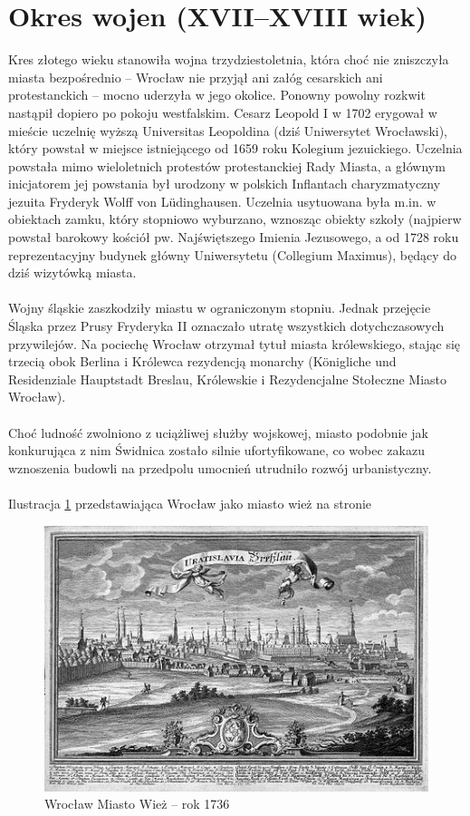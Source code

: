 \documentclass{article}
\begin{document}
\section{Okres wojen (XVII–XVIII wiek)}
Kres złotego wieku stanowiła wojna trzydziestoletnia, która choć nie zniszczyła miasta bezpośrednio – Wrocław nie przyjął ani załóg cesarskich ani protestanckich – mocno uderzyła w jego okolice. Ponowny powolny rozkwit nastąpił dopiero po pokoju westfalskim. Cesarz Leopold I w 1702 erygował w mieście uczelnię wyższą Universitas Leopoldina (dziś Uniwersytet Wrocławski), który powstał w miejsce istniejącego od 1659 roku Kolegium jezuickiego. Uczelnia powstała mimo wieloletnich protestów protestanckiej Rady Miasta, a głównym inicjatorem jej powstania był urodzony w polskich Inflantach charyzmatyczny jezuita Fryderyk Wolff von Lüdinghausen. Uczelnia usytuowana była m.in. w obiektach zamku, który stopniowo wyburzano, wznosząc obiekty szkoły (najpierw powstał barokowy kościół pw. Najświętszego Imienia Jezusowego, a od 1728 roku reprezentacyjny budynek główny Uniwersytetu (Collegium Maximus), będący do dziś wizytówką miasta.\\
\\
Wojny śląskie zaszkodziły miastu w ograniczonym stopniu. Jednak przejęcie Śląska przez Prusy Fryderyka II oznaczało utratę wszystkich dotychczasowych przywilejów. Na pociechę Wrocław otrzymał tytuł miasta królewskiego, stając się trzecią obok Berlina i Królewca rezydencją monarchy (Königliche und Residenziale Hauptstadt Breslau, Królewskie i Rezydencjalne Stołeczne Miasto Wrocław).\\
\\
Choć ludność zwolniono z uciążliwej służby wojskowej, miasto podobnie jak konkurująca z nim Świdnica zostało silnie ufortyfikowane, co wobec zakazu wznoszenia budowli na przedpolu umocnień utrudniło rozwój urbanistyczny.\\
\\
Ilustracja \ref{fig:Wrcolawmwiez} przedstawiająca Wrocław jako miasto wież na stronie \pageref{fig:Wrcolawmwiez}
\begin{figure}[h!]
\centering
\includegraphics[scale=1]{450px-Breslau_c1736.jpg}
\caption{Wrocław Miasto Wież – rok 1736}
\label{fig:Wrcolawmwiez}
\end{figure}
\end{document}
